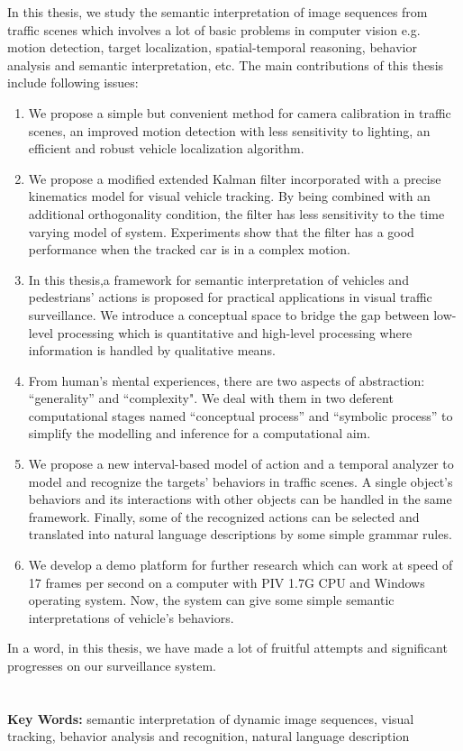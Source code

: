 In this thesis, we study the semantic interpretation of image sequences from traffic
scenes which involves a lot of basic problems in computer vision e.g. motion
detection, target localization, spatial-temporal reasoning, behavior analysis and
semantic interpretation, etc. The main contributions of this thesis include
following issues:
\begin{enumerate}
    \item We propose a simple but convenient method for camera calibration in
    traffic scenes, an improved motion detection with less sensitivity to lighting,
    an efficient and robust vehicle localization algorithm.
    \item We propose a modified extended Kalman filter incorporated with a precise
    kinematics model for visual vehicle tracking. By being combined with an additional orthogonality
    condition, the filter has less sensitivity to the time varying model of system. Experiments
    show that the filter has a good performance when the tracked car is in a complex motion.
    \item In this thesis,a framework for semantic interpretation of vehicles and pedestrians'
    actions is proposed for practical applications in visual traffic surveillance.  We introduce
    a conceptual space to bridge the gap between low-level processing which is quantitative
    and high-level processing where information is handled by qualitative means.
    \item From human's \`mental experiences, there are two aspects of abstraction: ``generality'' and
    ``complexity". We deal with them in two deferent computational stages named ``conceptual process'' and ``symbolic process'' to
    simplify the modelling and inference for a computational aim.
    \item We propose a new interval-based model of action and a temporal analyzer to model and
    recognize the targets' behaviors in traffic scenes. A single object's behaviors and its
    interactions with other objects can be handled in the same framework. Finally, some of the recognized
    actions can be selected and translated into natural language descriptions by some simple grammar
    rules.
    \item We develop a demo platform for further research which can work at
    speed of 17 frames per second on a computer with PIV 1.7G CPU and Windows
    operating system. Now, the system can give some simple semantic interpretations
    of vehicle's behaviors.
\end{enumerate}

In a word, in this thesis, we have made a lot of fruitful attempts and significant
progresses on our surveillance system.
\\
\\
\\
\noindent \textbf{Key Words:} semantic interpretation of dynamic image sequences,
visual tracking, behavior analysis and recognition, natural language description
